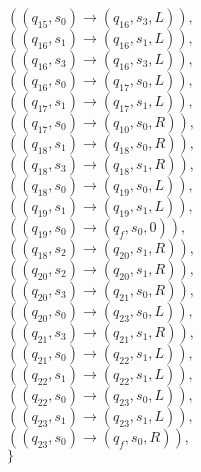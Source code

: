 \documentclass{article} %
\begin{document}
\begin{center}
\begin{varwidth}{\textwidth}
\begin{tasks}[label={},label-width={1cm}]
                \task
                $((q_{15}, s_{0}) \to ( q_{16}, s_{3}, L)),$\\
                $((q_{16}, s_{1}) \to ( q_{16}, s_{1}, L)),$\\
                $((q_{16}, s_{3}) \to ( q_{16}, s_{3}, L)),$\\
                $((q_{16}, s_{0}) \to ( q_{17}, s_{0}, L)),$\\
                $((q_{17}, s_{1}) \to ( q_{17}, s_{1}, L)),$\\
                $((q_{17}, s_{0}) \to ( q_{10}, s_{0}, R)),$\\
                $((q_{18}, s_{1}) \to ( q_{18}, s_{0}, R)),$\\
                $((q_{18}, s_{3}) \to ( q_{18}, s_{1}, R)),$\\
                $((q_{18}, s_{0}) \to ( q_{19}, s_{0}, L)),$\\
                $((q_{19}, s_{1}) \to ( q_{19}, s_{1}, L)),$\\
                $((q_{19}, s_{0}) \to ( q_{f}, s_{0}, 0)),$\\
                $((q_{18}, s_{2}) \to ( q_{20}, s_{1}, R)),$\\
                $((q_{20}, s_{2}) \to ( q_{20}, s_{1}, R)),$\\
                $((q_{20}, s_{3}) \to ( q_{21}, s_{0}, R)),$\\
                $((q_{20}, s_{0}) \to ( q_{23}, s_{0}, L)),$\\
                $((q_{21}, s_{3}) \to ( q_{21}, s_{1}, R)),$\\
                $((q_{21}, s_{0}) \to ( q_{22}, s_{1}, L)),$\\
                $((q_{22}, s_{1}) \to ( q_{22}, s_{1}, L)),$\\
                $((q_{22}, s_{0}) \to ( q_{23}, s_{0}, L)),$\\
                $((q_{23}, s_{1}) \to ( q_{23}, s_{1}, L)),$\\
                $((q_{23}, s_{0}) \to ( q_{f}, s_{0}, R)),$\\
                $\}$
            \end{tasks}
            \end{varwidth}
        \end{center}
\end{document}
